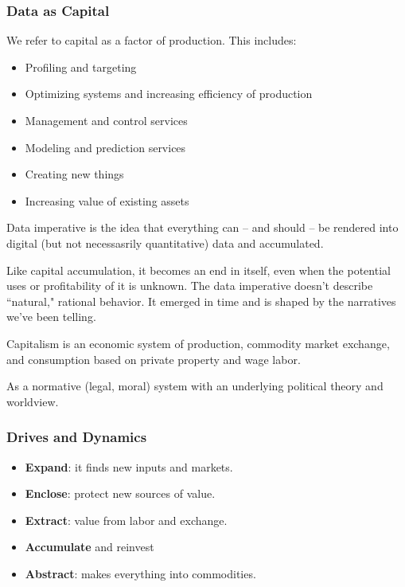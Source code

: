 \documentclass[openany]{book}
\begin{document}
\subsubsection{Data as Capital}
\begin{defn}[Capital]
	We refer to capital as a factor of production. This includes:
	\begin{itemize}
		\item Profiling and targeting
		\item Optimizing systems and increasing efficiency of production
		\item Management and control services
		\item Modeling and prediction services
		\item Creating new things
		\item Increasing value of existing assets
	\end{itemize}
\end{defn}

\begin{defn}
	Data imperative is the idea that everything can -- and should -- be rendered into digital (but not necessasrily quantitative) data and accumulated.
\end{defn}

Like capital accumulation, it becomes an end in itself, even when the potential uses or profitability of it is unknown. The data imperative doesn't describe ``natural," rational behavior. It emerged in time and is shaped by the narratives we've been telling.

\begin{defn}[Capitalism]
	Capitalism is an economic system of production, commodity market exchange, and consumption based on private property and wage labor.
	
	As a normative (legal, moral) system with an underlying political theory and worldview.
\end{defn}

\subsubsection{Drives and Dynamics}
\begin{itemize}
	\item \textbf{Expand}: it finds new inputs and markets.
	\item \textbf{Enclose}: protect new sources of value.
	\item \textbf{Extract}: value from labor and exchange.
	\item \textbf{Accumulate} and reinvest
	\item \textbf{Abstract}: makes everything into commodities.
\end{itemize}
\end{document}

